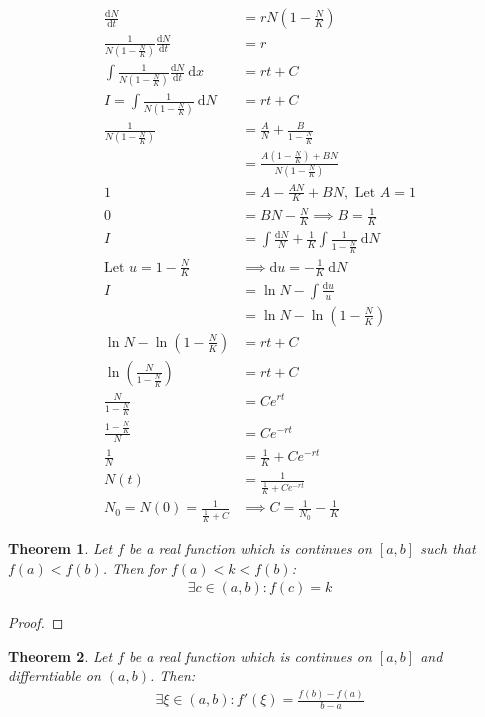 \documentclass{article}
\theoremstyle{plain}
\newtheorem{theorem}{Theorem}
\theoremstyle{definition}
\newcommand{\dx}{\text{d}}
\begin{document}
\begin{align*}
	\frac{\dx N}{\dx t} &= rN\left(1-\frac{N}{K}\right) \\
	\frac{1}{N\left(1-\frac{N}{K}\right)}\frac{\dx N}{\dx t} &= r \\
	\int\frac{1}{N\left(1-\frac{N}{K}\right)}\frac{\dx N}{\dx t}\ \dx x&=rt+C \\
	I = \int\frac{1}{N\left(1-\frac{N}{K}\right)}\ \dx N&=rt+C \\
	\frac{1}{N\left(1-\frac{N}{K}\right)}
	&=\frac{A}{N}+\frac{B}{1-\frac{N}{K}}\\
	&=\frac{A\left(1-\frac{N}{K}\right)+BN}{N\left(1-\frac{N}{K}\right)}\\
	1&=A-\frac{AN}{K}+BN, \text{ Let } A= 1\\
	0&=BN-\frac{N}{K} \implies B= \frac{1}{K} \\
	I&=\int \frac{\dx N}{N}+\frac{1}{K}\int \frac{1}{1-\frac{N}{K}}\ \dx N\\
	\text{Let } u = 1-\frac{N}{K}&\implies \dx u = -\frac{1}{K}\ \dx N\\
	I&= \ln N - \int \frac{\dx u}{u}\\
	 &= \ln N - \ln \left(1-\frac{N}{K}\right) \\
	\ln N - \ln \left(1-\frac{N}{K}\right) &= rt+C\\
	\ln \left(\frac{N}{1-\frac{N}{K}}\right) &= rt+C\\
	\frac{N}{1-\frac{N}{K}} &= Ce^{rt}\\
	\frac{1-\frac{N}{K}}{N} &= Ce^{-rt}\\
	\frac{1}{N} &=\frac{1}{K}+ Ce^{-rt}\\
	N(t) &=\frac{1}{\frac{1}{K}+ Ce^{-rt}}\\
	N_0 = N(0) = \frac{1}{\frac{1}{K}+C} &\implies C = \frac{1}{N_0}-\frac{1}{K}
\end{align*}
\newpage
\begin{theorem}
	Let $f$ be a real function which is continues on $[a,b]$ such that
	$f(a)<f(b)$. Then for $f(a)<k<f(b)$:
	\begin{equation}
	\begin{aligned}
		\exists c \in (a,b):f(c) =k
	\end{aligned}
	\end{equation}
\end{theorem}
\begin{proof}
\end{proof}
\begin{theorem}
	Let $f$ be a real function which is continues on $[a,b]$ and differntiable
	on $(a,b)$. Then:
	\begin{equation}
	\begin{aligned}
		\exists \xi \in (a,b):f'(\xi) =\frac{f(b)-f(a)}{b-a}
	\end{aligned}
	\end{equation}
\end{theorem}
\end{document}
